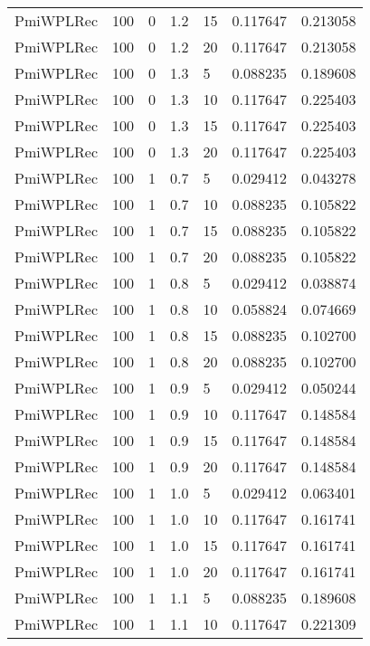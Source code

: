 \begin{tabular}{lllrlrr}
 PmiWPLRec &  100 &     0 &   1.2 &   15 &     0.117647 &  0.213058 \\
 PmiWPLRec &  100 &     0 &   1.2 &   20 &     0.117647 &  0.213058 \\
 PmiWPLRec &  100 &     0 &   1.3 &    5 &     0.088235 &  0.189608 \\
 PmiWPLRec &  100 &     0 &   1.3 &   10 &     0.117647 &  0.225403 \\
 PmiWPLRec &  100 &     0 &   1.3 &   15 &     0.117647 &  0.225403 \\
 PmiWPLRec &  100 &     0 &   1.3 &   20 &     0.117647 &  0.225403 \\
 PmiWPLRec &  100 &     1 &   0.7 &    5 &     0.029412 &  0.043278 \\
 PmiWPLRec &  100 &     1 &   0.7 &   10 &     0.088235 &  0.105822 \\
 PmiWPLRec &  100 &     1 &   0.7 &   15 &     0.088235 &  0.105822 \\
 PmiWPLRec &  100 &     1 &   0.7 &   20 &     0.088235 &  0.105822 \\
 PmiWPLRec &  100 &     1 &   0.8 &    5 &     0.029412 &  0.038874 \\
 PmiWPLRec &  100 &     1 &   0.8 &   10 &     0.058824 &  0.074669 \\
 PmiWPLRec &  100 &     1 &   0.8 &   15 &     0.088235 &  0.102700 \\
 PmiWPLRec &  100 &     1 &   0.8 &   20 &     0.088235 &  0.102700 \\
 PmiWPLRec &  100 &     1 &   0.9 &    5 &     0.029412 &  0.050244 \\
 PmiWPLRec &  100 &     1 &   0.9 &   10 &     0.117647 &  0.148584 \\
 PmiWPLRec &  100 &     1 &   0.9 &   15 &     0.117647 &  0.148584 \\
 PmiWPLRec &  100 &     1 &   0.9 &   20 &     0.117647 &  0.148584 \\
 PmiWPLRec &  100 &     1 &   1.0 &    5 &     0.029412 &  0.063401 \\
 PmiWPLRec &  100 &     1 &   1.0 &   10 &     0.117647 &  0.161741 \\
 PmiWPLRec &  100 &     1 &   1.0 &   15 &     0.117647 &  0.161741 \\
 PmiWPLRec &  100 &     1 &   1.0 &   20 &     0.117647 &  0.161741 \\
 PmiWPLRec &  100 &     1 &   1.1 &    5 &     0.088235 &  0.189608 \\
 PmiWPLRec &  100 &     1 &   1.1 &   10 &     0.117647 &  0.221309 \\

\end{tabular}
